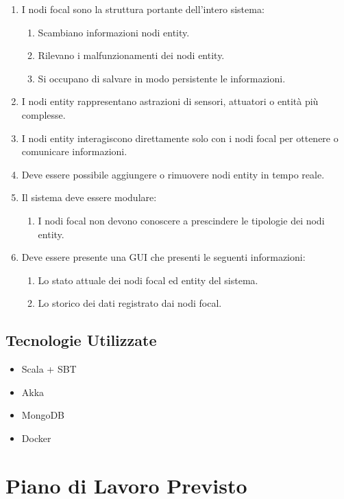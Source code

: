 \documentclass[12pt,a4paper,openright,twoside]{book}
\begin{document}
\begin{enumerate}
    \item I nodi focal sono la struttura portante dell'intero sistema:
    \begin{enumerate}
        \item Scambiano informazioni nodi entity.
        \item Rilevano i malfunzionamenti dei nodi entity.
        \item Si occupano di salvare in modo persistente le informazioni.
    \end{enumerate}
    \item I nodi entity rappresentano astrazioni di sensori, attuatori o entità più complesse.
    \item I nodi entity interagiscono direttamente solo con i nodi focal per ottenere o comunicare informazioni.
    \item Deve essere possibile aggiungere o rimuovere nodi entity in tempo reale.
    \item Il sistema deve essere modulare:
    \begin{enumerate}
        \item I nodi focal non devono conoscere a prescindere le tipologie dei nodi entity.
    \end{enumerate}
    \item Deve essere presente una GUI che presenti le seguenti informazioni:
    \begin{enumerate}
        \item Lo stato attuale dei nodi focal ed entity del sistema.
        \item Lo storico dei dati registrato dai nodi focal.
    \end{enumerate}
\end{enumerate}

\section{Tecnologie Utilizzate}

\begin{itemize}
    \item Scala + SBT
    \item Akka
    \item MongoDB
    \item Docker
\end{itemize}

\chapter{Piano di Lavoro Previsto}
\label{chap:expectedWorkPlan}


%
%
\end{document}
